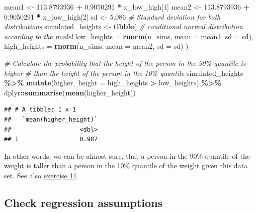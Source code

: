 \documentclass[
]{book}
\newenvironment{Shaded}{\begin{snugshade}}{\end{snugshade}}
\newcommand{\AttributeTok}[1]{\textcolor[rgb]{0.13,0.29,0.53}{#1}}
\newcommand{\CommentTok}[1]{\textcolor[rgb]{0.56,0.35,0.01}{\textit{#1}}}
\newcommand{\DecValTok}[1]{\textcolor[rgb]{0.00,0.00,0.81}{#1}}
\newcommand{\FloatTok}[1]{\textcolor[rgb]{0.00,0.00,0.81}{#1}}
\newcommand{\FunctionTok}[1]{\textcolor[rgb]{0.13,0.29,0.53}{\textbf{#1}}}
\newcommand{\NormalTok}[1]{#1}
\newcommand{\OtherTok}[1]{\textcolor[rgb]{0.56,0.35,0.01}{#1}}
\newcommand{\SpecialCharTok}[1]{\textcolor[rgb]{0.81,0.36,0.00}{\textbf{#1}}}
\begin{document}
\begin{Shaded}
\begin{Highlighting}[]
\NormalTok{mean1 }\OtherTok{\textless{}{-}} \FloatTok{113.8793936} \SpecialCharTok{+} \FloatTok{0.9050291} \SpecialCharTok{*}\NormalTok{ x\_low\_high[}\DecValTok{1}\NormalTok{]}
\NormalTok{mean2 }\OtherTok{\textless{}{-}} \FloatTok{113.8793936} \SpecialCharTok{+} \FloatTok{0.9050291} \SpecialCharTok{*}\NormalTok{ x\_low\_high[}\DecValTok{2}\NormalTok{]}
\NormalTok{sd }\OtherTok{\textless{}{-}} \FloatTok{5.086}  \CommentTok{\# Standard deviation for both distributions}
\NormalTok{simulated\_heights }\OtherTok{\textless{}{-}} \FunctionTok{tibble}\NormalTok{(}
  \CommentTok{\# conditional normal distribution according to the model}
  \AttributeTok{low\_heights =} \FunctionTok{rnorm}\NormalTok{(n\_sims, }\AttributeTok{mean =}\NormalTok{ mean1, }\AttributeTok{sd =}\NormalTok{ sd),}
  \AttributeTok{high\_heights =} \FunctionTok{rnorm}\NormalTok{(n\_sims, }\AttributeTok{mean =}\NormalTok{  mean2, }\AttributeTok{sd =}\NormalTok{ sd)}
\NormalTok{)}

\CommentTok{\# Calculate the probability that the height of the person in the 90\% quantile is higher}
\CommentTok{\# than the height of the person in the 10\% quantile}
\NormalTok{simulated\_heights }\SpecialCharTok{\%\textgreater{}\%}
  \FunctionTok{mutate}\NormalTok{(}\AttributeTok{higher\_height =}\NormalTok{ high\_heights }\SpecialCharTok{\textgreater{}}\NormalTok{ low\_heights) }\SpecialCharTok{\%\textgreater{}\%}
\NormalTok{  dplyr}\SpecialCharTok{::}\FunctionTok{summarise}\NormalTok{(}\FunctionTok{mean}\NormalTok{(higher\_height))}
\end{Highlighting}
\end{Shaded}

\begin{verbatim}
## # A tibble: 1 x 1
##   `mean(higher_height)`
##                   <dbl>
## 1                 0.987
\end{verbatim}

In other words, we can be almost sure, that a person in the 90\% quantile of the weight
is taller than a person in the 10\% quantile of the weight given this data set.
See also \hyperref[exercise11_simpl_lin_r]{exercise 11}.

\subsection{Check regression assumptions}\label{check-regression-assumptions}
\end{document}
